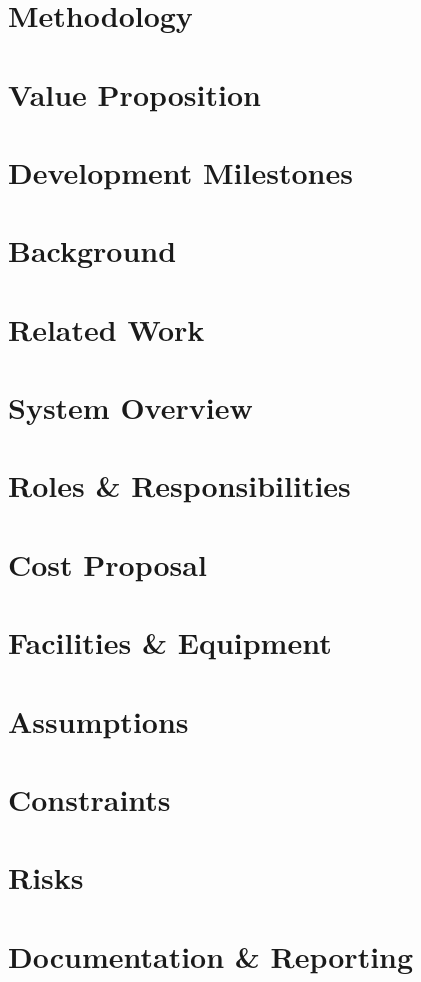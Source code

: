 \documentclass[11pt,letterpaper]{article}
\begin{document}
\section {Methodology}

\section{Value Proposition}

\newpage
\section{Development Milestones}

\setcounter{table}{0}
\newpage

\section{Background}

\section{Related Work}

\section{System Overview}

\newpage
\section{Roles \& Responsibilities}

\section{Cost Proposal}

\section{Facilities \& Equipment}

\section{Assumptions}

\section{Constraints}

\section{Risks}

\section{Documentation \& Reporting}

\newpage




{}
\end{document}
